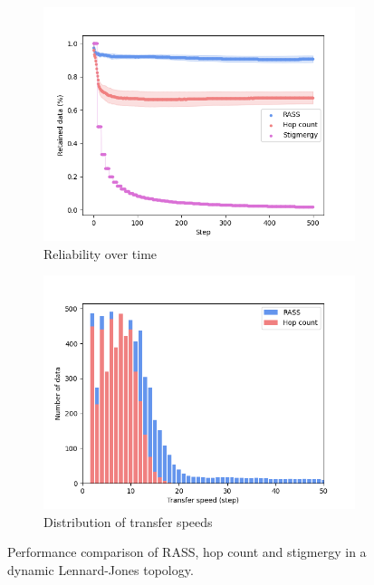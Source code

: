 \documentclass[runningheads]{llncs}
\begin{document}
\begin{figure}
    \centering
    \begin{subfigure}{0.49\textwidth}
        \includegraphics[width=\textwidth]{figures/lennard_reliability.png}
        \caption{Reliability over time}
        \label{results:lennard_100_reliability}
    \end{subfigure}
    \begin{subfigure}{0.49\textwidth}
        \includegraphics[width=\textwidth]{figures/lennard_speed.png}
        \caption{Distribution of transfer speeds}
        \label{results:lennard_100_speed}
    \end{subfigure}
    \caption{Performance comparison of RASS, hop count and stigmergy in a dynamic Lennard-Jones topology.}
    \label{results:dynamicTopologyLennard}
    \vspace{-2mm}
\end{figure}
\end{document}
